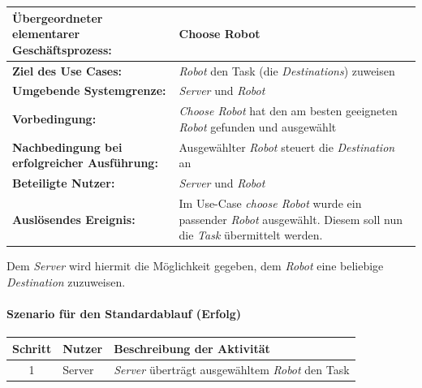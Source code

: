 				\begin{table}[H]
					\centering
					\begin{tabularx}{\textwidth}{|p{5cm}|X|}
						\hline
						\textbf{Übergeordneter elementarer Geschäftsprozess:} & Choose Robot  \\ \hline
						\textbf{Ziel des Use Cases:} & \emph{Robot} den Task (die \emph{Destinations}) zuweisen\\ \hline
						\textbf{Umgebende Systemgrenze:} & \emph{Server} und \emph{Robot} \\ \hline
						\textbf{Vorbedingung:} & \textit{ \glqq Choose Robot \grqq } hat den am besten geeigneten \emph{Robot} gefunden und ausgewählt\\ \hline
						\textbf{Nachbedingung bei erfolgreicher Ausführung:} & Ausgewählter \emph{Robot} steuert die \emph{Destination} an\\ \hline
						\textbf{Beteiligte Nutzer:} & \emph{Server} und \emph{Robot}\\ \hline
						\textbf{Auslösendes Ereignis:} & Im Use-Case \textit{ \glqq choose Robot \grqq } wurde ein passender \emph{Robot} ausgewählt. Diesem soll nun die \emph{Task} übermittelt werden. \\
						\hline
					\end{tabularx}
				\end{table}
				
				Dem \emph{Server} wird hiermit die Möglichkeit gegeben, dem \emph{Robot} eine beliebige \emph{Destination} zuzuweisen. 
				
				\paragraph*{Szenario für den Standardablauf (Erfolg)}
				
				\begin{table}[H]
					\centering
					\begin{tabularx}{\textwidth}{|c|p{2cm}|X|}
						\hline
						Schritt & Nutzer & Beschreibung der Aktivität \\ \hline
						1 & Server & \emph{Server} überträgt ausgewähltem \emph{Robot} den Task \\
						\hline
					\end{tabularx}
				\end{table}
				
				
